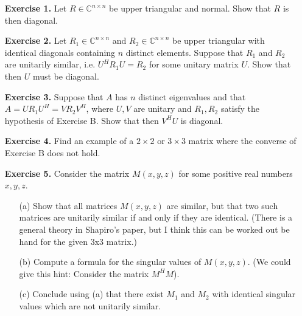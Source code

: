 \documentclass[14pt]{report}
\begin{document}
\begin{enumerate}
  \item[\textbf{Exercise 1.}] Let $R\in\mathbb{C}^{n\times n}$ be upper 
    triangular and normal. Show that $R$ is then diagonal. 

  \item[\textbf{Exercise 2.}] Let $R_1\in\mathbb{C}^{n\times n}$ and
    $R_2\in\mathbb{C}^{n\times n}$ be upper triangular with identical diagonals
    containing $n$ distinct elements. Suppose that $R_1$ and $R_2$ are 
    unitarily similar, i.e. $U^HR_1U = R_2$ for some unitary matrix $U$.
    Show that then $U$ must be diagonal.

  \item[\textbf{Exercise 3.}] Suppose that $A$ has $n$ distinct eigenvalues and
    that $A = U R_1 U^H = V R_2 V^H$, where $U,V$ are unitary and 
    $R_1, R_2$ satisfy the hypothesis of Exercise B. Show that then $V^H U$ is
    diagonal.

  \item[\textbf{Exercise 4.}] Find an example of a $2\times2$ or $3\times3$
    matrix where the converse of Exercise B does not hold.

  \item[\textbf{Exercise 5.}] Consider the matrix $M(x,y,z)$ for some positive
    real numbers $x,y,z$.
    \begin{enumerate}
      \item[(a)] Show that all matrices $M(x,y,z)$ are similar, but that two such
        matrices are unitarily similar if and only if they are identical.
        (There is a general theory in Shapiro's paper, but I think this can be
        worked out be hand for the given 3x3 matrix.)
      \item[(b)] Compute a formula for the singular values of $M(x,y,z)$. 
        (We could give this hint: Consider the matrix $M^H M$).
      \item[(c)] Conclude using (a) that there exist $M_1$ and $M_2$ with
        identical singular values which are not unitarily similar.
      \end{enumerate}
  

\end{enumerate}
\end{document}
